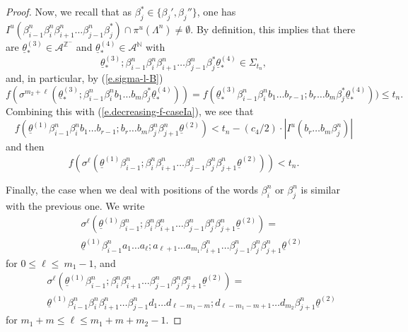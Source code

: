 \documentclass[12pt]{amsart}
\theoremstyle{plain} %
\theoremstyle{definition} %
\numberwithin{equation}{section}
\begin{document}
\begin{proof}
Now, we recall that as $\beta_j^{\ast}\in\{\beta_j', \beta_j''\}$, one has 
$I^u(\beta^n_{i-1}\beta^n_i\beta^n_{i+1}\dots\beta^n_{j-1}\beta^*_j)\cap \pi^u(\Lambda^n)\neq\emptyset.$
By definition, this implies that there are $\underline{\theta}^{(3)}_*\in\mathcal{A}^{\mathbb{Z}^-}$ and $\underline{\theta}^{(4)}_*\in\mathcal{A}^{\mathbb{N}}$ with 
$$\underline{\theta}^{(3)}_*;\beta^n_{i-1}\beta^n_i\beta^n_{i+1}\dots\beta^n_{j-1}\beta^*_j\underline{\theta}^{(4)}_*\in\Sigma_{t_n},$$
and, in particular, by (\ref{e.sigma-l-B})
$$f(\sigma^{m_2+\ell}(\underline{\theta}^{(3)}_*;\beta^n_{i-1}\beta^n_ib_1\dots b_m\beta^*_j\underline{\theta}^{(4)}_*))=f(\underline{\theta}^{(3)}_*\beta^n_{i-1}\beta^n_ib_1\dots b_{r-1};b_{r} \dots b_m\beta^*_j\underline{\theta}^{(4)}_*))\leq t_n.$$
Combining this with (\ref{e.decreasing-f-caseIa}), we see that 
$$f(\underline{\theta}^{(1)}\beta^n_{i-1}\beta^n_i b_1\dots b_{r-1}; b_r\dots b_{m}\beta^n_j\beta^n_{j+1}\underline{\theta}^{(2)}) < t_n - (c_4/2)\cdot |I^u(b_r\dots b_{m}\beta^n_j)|$$
and then
\begin{equation}\label{e.delta1-definition}
f(\sigma^{\ell}(\underline{\theta}^{(1)}\beta^n_{i-1};\beta^n_i\beta^n_{i+1}\dots\beta^n_{j-1}\beta^n_j\beta^n_{j+1}\underline{\theta}^{(2)})) < t_n.
\end{equation}

Finally, the case when we deal with positions of the words $\beta^n_{i}$ or $\beta^n_{j}$ is similar with the previous one. We write
\begin{eqnarray*}\label{e.sigma-l-A}
& & \sigma^{\ell}(\underline{\theta}^{(1)}\beta^n_{i-1};\beta^n_i\beta^n_{i+1}\dots\beta^n_{j-1}\beta^n_j\beta^n_{j+1}\underline{\theta}^{(2)}) = \\ & & \underline{\theta}^{(1)}\beta^n_{i-1}a_1\dots a_{\ell};a_{\ell+1} \dots a_{m_1} \beta^n_{i+1}\dots \beta^n_{j-1}\beta^n_j\beta^n_{j+1}\underline{\theta}^{(2)} \nonumber
\end{eqnarray*}
for $0\leq\ell\leq\ m_1-1$, and 
\begin{eqnarray*}\label{e.sigma-l-D}
& & \sigma^{\ell}(\underline{\theta}^{(1)}\beta^n_{i-1};\beta^n_i\beta^n_{i+1}\dots\beta^n_{j-1}\beta^n_j\beta^n_{j+1}\underline{\theta}^{(2)}) = \\ & & \underline{\theta}^{(1)}\beta^n_{i-1}\beta^n_i\beta^n_{i+1}\dots\beta^n_{j-1}d_1 \dots d_{\ell - m_1-m};d_{\ell - m_1-m+1}\dots d_{m_2}\beta^n_{j+1}\underline{\theta}^{(2)} \nonumber
\end{eqnarray*}
for $m_1+m\leq\ell\leq m_1+m+m_2-1$.


\end{proof}
\end{document}
